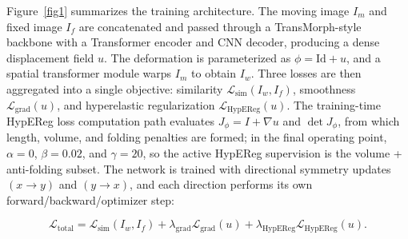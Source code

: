 \documentclass[jimaging,article,submit,pdftex,moreauthors]{Definitions/mdpi}
\begin{document}
Figure~\ref{fig1} summarizes the training architecture. The moving image \(I_m\) and fixed image \(I_f\) are concatenated and passed through a TransMorph-style backbone with a Transformer encoder and CNN decoder, producing a dense displacement field \(u\). The deformation is parameterized as \(\phi=\mathrm{Id}+u\), and a spatial transformer module warps \(I_m\) to obtain \(I_w\). Three losses are then aggregated into a single objective: similarity \(\mathcal{L}_{\mathrm{sim}}(I_w,I_f)\), smoothness \(\mathcal{L}_{\mathrm{grad}}(u)\), and hyperelastic regularization \(\mathcal{L}_{\mathrm{HypEReg}}(u)\). The training-time HypEReg loss computation path evaluates \(J_\phi=I+\nabla u\) and \(\det J_\phi\), from which length, volume, and folding penalties are formed; in the final operating point, \(\alpha=0\), \(\beta=0.02\), and \(\gamma=20\), so the active HypEReg supervision is the volume + anti-folding subset. The network is trained with directional symmetry updates \((x\rightarrow y)\) and \((y\rightarrow x)\), and each direction performs its own forward/backward/optimizer step:
\begin{linenomath}
\begin{equation}
\mathcal{L}_{\mathrm{total}}
=
\mathcal{L}_{\mathrm{sim}}(I_w,I_f)
+
\lambda_{\mathrm{grad}}\mathcal{L}_{\mathrm{grad}}(u)
+
\lambda_{\mathrm{HypEReg}}\mathcal{L}_{\mathrm{HypEReg}}(u).
\end{equation}
\end{linenomath}
\end{document}
